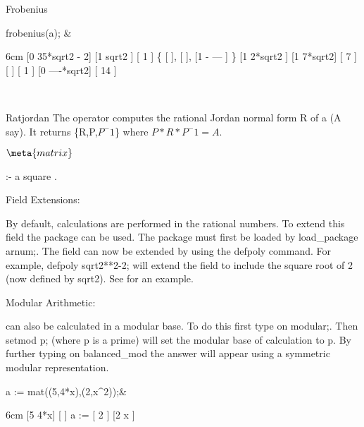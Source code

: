 \begin{Operator}{Frobenius}
\begin{Examples}
 frobenius(a); &
\begin{multilineoutput}{6cm}
  [0  35*sqrt2 - 2]    [1   sqrt2 ]    [           1  ]
\{ [               ],   [          ],   [1       - --- ]  \}
  [1    2*sqrt2   ]    [1  7*sqrt2]    [           7  ]
                                       [              ]
                                       [     1        ]
                                       [0   ----*sqrt2]
                                       [     14       ]

\end{multilineoutput}\\
\end{Examples}
\end{Operator}



\begin{Operator}{Ratjordan}
The operator  computes the rational Jordan normal form R
of a  (A say). It returns \{R,P,$P^-1$\} where $P*R*P^-1 = A$.

\begin{Syntax}
\(\meta{matrix}\)

 :- a square .
\end{Syntax}

Field Extensions:

By default, calculations are performed in the rational numbers. To 
extend this field the  package can be used. The package must
first be loaded by  load\_package arnum;. The field can now be extended
by using the defpoly command. For example, defpoly sqrt2**2-2; will
extend the field to include the square root of 2 (now defined by sqrt2).
See  for an example.

Modular Arithmetic:

 can also be calculated in a modular base. To do this 
first type on  modular;. Then setmod p; (where p is a prime) will set 
the modular base of calculation to p. By further typing on balanced\_mod
the answer will appear using a symmetric modular representation.

\begin{Examples}
 a := mat((5,4*x),(2,x^2));&
\begin{multilineoutput}{6cm}
     [5  4*x]
     [      ]
a := [    2 ]
     [2  x  ]
\end{multilineoutput}\\


\end{Examples}
\end{Operator}
